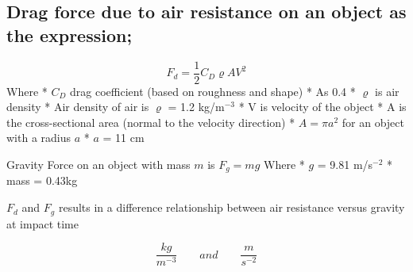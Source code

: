 \documentclass[11pt]{article}
\begin{document}
    \subsection{Drag force due to air resistance on an object as the
expression;}\label{drag-force-due-to-air-resistance-on-an-object-as-the-expression}

\[
F_d =
\frac{1}{2} C_D \varrho A V^2
\] Where * \(C_D\) drag coefficient (based on roughness and shape) * As
0.4 * \(\varrho\) is air density * Air density of air is \(\varrho\) =
1.2 kg/m\(^{-3}\) * V is velocity of the object * A is the
cross-sectional area (normal to the velocity direction) *
\(A = \pi a^{2}\) for an object with a radius \(a\) * \(a\) = 11 cm

Gravity Force on an object with mass \(m\) is \(F_g = mg\) Where * \(g\)
= 9.81 m/s\(^{-2}\) * mass = 0.43kg

\(F_d\) and \(F_g\) results in a difference relationship between air
resistance versus gravity at impact time

\[\frac{kg}{m^{-3}} \qquad and \qquad \frac{m}{s^{-2}}\]
\end{document}
